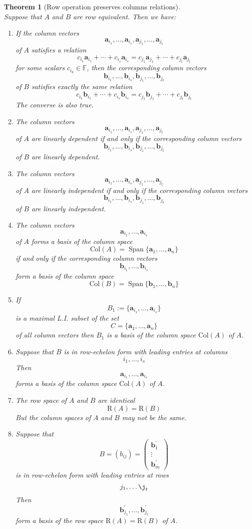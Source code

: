 \documentclass[12pt]{article}
\newcommand{\col}{\mathrm{Col}}
\newcommand{\row}{\mathrm{R}}
\newtheorem{theorem}{Theorem}[section]
\theoremstyle{definition}
\DeclareMathOperator{\spn}{Span}
\begin{document}
\begin{theorem}[Row operation preserves columns relations]
\hfill\\\normalfont
Suppose that $A$ and $B$ are row equivalent. Then we have:
\begin{enumerate}[label=(\arabic*)]
\item If the column vectors
\[
\mathbf{a}_{i_1},\ldots,\mathbf{a}_{i_s},\mathbf{a}_{j_1},\ldots,\mathbf{a}_{j_t}
\]
of $A$ satisfies a relation
\[
c_{i_1}\mathbf{a}_{i_1}+\cdots+c_{i_s}\mathbf{a}_{i_s}=c_{j_1}\mathbf{a}_{j_1}+\cdots+c_{j_t}\mathbf{a}_{j_t}
\]
for some scalars $c_{i_k}\in\mathbb{F}$, then the corresponding column vectors
\[
\mathbf{b}_{i_1},\ldots,\mathbf{b}_{i_s},\mathbf{b}_{j_1},\ldots,\mathbf{b}_{j_t}
\]
of $B$ satisfies exactly the same relation
\[
c_{i_1}\mathbf{b}_{i_1}+\cdots+c_{i_s}\mathbf{b}_{i_s}=c_{j_1}\mathbf{b}_{j_1}+\cdots+c_{j_t}\mathbf{b}_{j_t}
\]
The converse is also true.
\item The column vectors
\[
\mathbf{a}_{i_1},\ldots,\mathbf{a}_{i_s},\mathbf{a}_{j_1},\ldots,\mathbf{a}_{j_t}
\]
of $A$ are linearly dependent if and only if the corresponding column vectors
\[
\mathbf{b}_{i_1},\ldots,\mathbf{b}_{i_s},\mathbf{b}_{j_1},\ldots,\mathbf{b}_{j_t}
\]
of $B$ are linearly dependent.
\item The column vectors
\[
\mathbf{a}_{i_1},\ldots,\mathbf{a}_{i_s},\mathbf{a}_{j_1},\ldots,\mathbf{a}_{j_t}
\]
of $A$ are linearly independent if and only if the corresponding column vectors
\[
\mathbf{b}_{i_1},\ldots,\mathbf{b}_{i_s},\mathbf{b}_{j_1},\ldots,\mathbf{b}_{j_t}
\]
of $B$ are linearly independent.
\item The column vectors
\[
\mathbf{a}_{i_1},\ldots,\mathbf{a}_{i_s}
\]
of $A$ forms a basis of the column space
\[
\col(A)=\spn\{\mathbf{a}_1,\ldots,\mathbf{a}_n\}
\] 
if and only if the corresponding column vectors
\[
\mathbf{b}_{i_1},\ldots,\mathbf{b}_{i_s}
\]
form a basis of the column space
\[
\col(B)=\spn\{\mathbf{b}_1,\ldots,\mathbf{b}_n\}
\]
\item If
\[
B_1:=\{\mathbf{a}_{i_1},\ldots,\mathbf{a}_{i_s}\}
\]
is a maximal L.I. subset of the set
\[
C=\{\mathbf{a}_1,\ldots,\mathbf{a}_n\}
\]
of all column vectors then $B_1$ is a basis of the column space $\col(A)$ of $A$.
\item Suppose that $B$ is in row-echelon form with leading entries at columns
\[
i_1,\ldots,i_s
\]
Then
\[
\mathbf{a}_{i_1},\ldots,\mathbf{a}_{i_s}
\]
forms a basis of the column space $\col(A)$ of $A$.
\item The row space of $A$ and $B$ are identical
\[
\row(A)=\row(B)
\]
But the column spaces of $A$ and $B$ may not be the same.
\item Suppose that 
\[
B=(b_{ij})=\begin{pmatrix}\mathbf{b}^\prime_1\\\vdots\\\mathbf{b}^\prime_m\end{pmatrix}
\]
is in row-echelon form with leading entries at rows
\[
j_1,\ldots\j_t
\]
Then
\[
\mathbf{b}^\prime_{j_1},\ldots,\mathbf{b}^\prime_{j_t}
\]
form a basis of the row space $\row(A)=\row(B)$ of $A$.
\end{enumerate}
\end{theorem}
\clearpage
\end{document}
